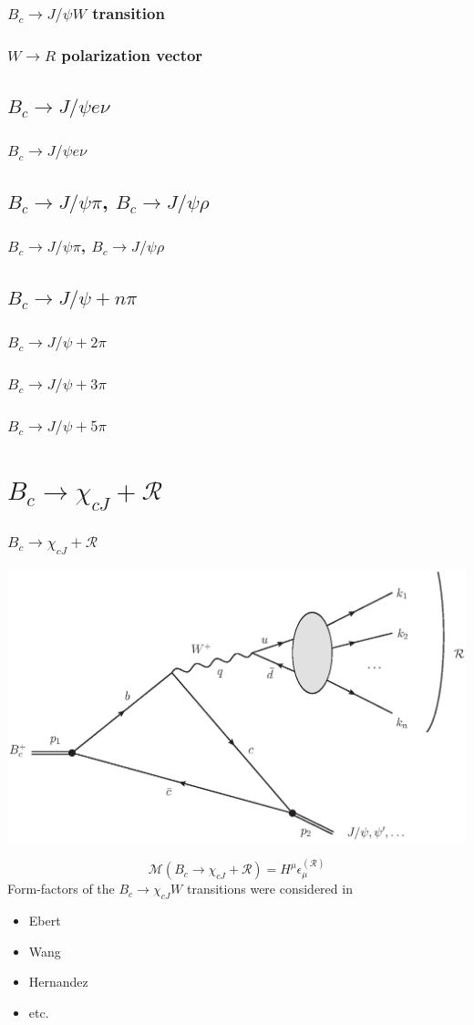 \documentclass{beamer}
\newcommand{\R}{\mathcal{R}}
\newcommand{\M}{\mathcal{M}}
\begin{document}
\begin{frame}
  \frametitle{$B_c \to J/\psi W$ transition}
\end{frame}

\begin{frame}
  \frametitle{$W\to R$ polarization vector}
\end{frame}

\subsection{$B_c\to J/\psi e\nu$}
\begin{frame}
  \frametitle{$B_c\to J/\psi e\nu$}
\end{frame}

\subsection{$B_c\to J/\psi \pi$, $B_c\to J/\psi \rho$}
\begin{frame}
  \frametitle{$B_c\to J/\psi \pi$, $B_c\to J/\psi \rho$}
\end{frame}

\subsection{$B_c\to J/\psi + n\pi$}
\begin{frame}
  \frametitle{$B_c\to J/\psi+ 2\pi$}
\end{frame}

\begin{frame}
  \frametitle{$B_c\to J/\psi + 3\pi$}
\end{frame}

\begin{frame}
  \frametitle{$B_c\to J/\psi +  5\pi$}
\end{frame}


\section{$B_c\to \chi_{cJ}+\R$}
\begin{frame}
  \frametitle{$B_c\to \chi_{cJ}+\R$}
\begin{center}
  \includegraphics[width=0.5\columnwidth]{diags_BcCCW}
\end{center}
$$\M\left(B_c \to \chi_{cJ} + \R\right) = H^\mu \epsilon^{(\R)}_\mu$$
Form-factors of the $B_c\to \chi_{cJ}W$ transitions were considered in
\begin{itemize}
\item Ebert
\item Wang
\item Hernandez
\item etc.
\end{itemize}
\end{frame}
\end{document}
